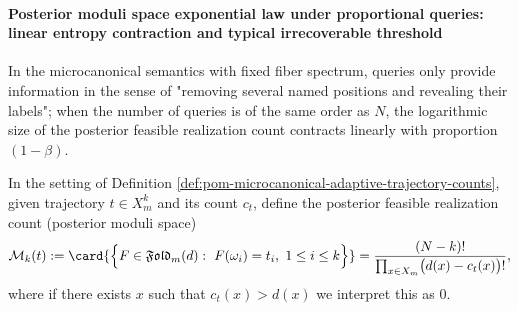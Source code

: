 \paragraph{Posterior moduli space exponential law under proportional queries: linear entropy contraction and typical irrecoverable threshold}
In the microcanonical semantics with fixed fiber spectrum, queries only provide information in the sense of "removing several named positions and revealing their labels";
when the number of queries is of the same order as \(N\), the logarithmic size of the posterior feasible realization count contracts linearly with proportion \((1-\beta)\).

\begin{definition}\label{def:pom-microcanonical-posterior-moduli-size-beta}
In the setting of Definition \ref{def:pom-microcanonical-adaptive-trajectory-counts}, given trajectory \(t\in X_m^k\) and its count \(c_t\), define the posterior feasible realization count (posterior moduli space)
\[
\mathcal{M}_k(t)
:=\card{\Bigl\{F\in\mathfrak{Fold}_m(d):\ F(\omega_i)=t_i,\ 1\le i\le k\Bigr\}}
=\frac{(N-k)!}{\prod_{x\in X_m}\bigl(d(x)-c_t(x)\bigr)!},
\]
where if there exists \(x\) such that \(c_t(x)>d(x)\) we interpret this as \(0\).
\end{definition}

